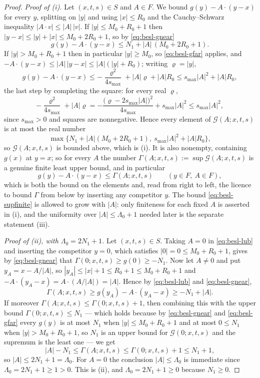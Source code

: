 \begin{proof}
\emph{Proof of (i).}
Let $(x,t,s)\in S$ and $A\in F$. We bound $g(y)-A\cdot(y-x)$ for every $y$,
splitting on $|y|$ and using $|x|\le R_0$ and the Cauchy--Schwarz inequality
$|A\cdot v|\le|A|\,|v|$.
If $|y|\le M_0+R_0+1$ then $|y-x|\le|y|+|x|\le M_0+2R_0+1$, so by
\eqref{eq:besl-gnear}
\[
  g(y)-A\cdot(y-x)\le N_1+|A|\,(M_0+2R_0+1).
\]
If $|y|>M_0+R_0+1$ then in particular $|y|\ge M_0$, so \eqref{eq:besl-gfar}
applies, and $-A\cdot(y-x)\le|A|\,|y-x|\le|A|(|y|+R_0)$; writing $\varrho=|y|$,
\[
  g(y)-A\cdot(y-x)\le-\frac{\varrho^2}{4s_{\max}}+|A|\varrho+|A|R_0
   \le s_{\max}|A|^2+|A|R_0 ,
\]
the last step by completing the square: for every real $\varrho$,
\[
  -\frac{\varrho^2}{4s_{\max}}+|A|\varrho
   =-\frac{\bigl(\varrho-2s_{\max}|A|\bigr)^2}{4s_{\max}}+s_{\max}|A|^2
   \le s_{\max}|A|^2 ,
\]
since $s_{\max}>0$ and squares are nonnegative. Hence every element of
$\mathcal G(A;x,t,s)$ is at most the real number
\begin{equation}\label{eq:besl-supfinite}
  \max\bigl\{N_1+|A|(M_0+2R_0+1),\ s_{\max}|A|^2+|A|R_0\bigr\},
\end{equation}
so $\mathcal G(A;x,t,s)$ is bounded above, which is (i). It is also nonempty,
containing $g(x)$ at $y=x$; so for every $A$ the number
$\Gamma(A;x,t,s):=\sup\mathcal G(A;x,t,s)$ is a genuine finite least upper bound,
and in particular
\begin{equation}\label{eq:besl-lub}
  g(y)-A\cdot(y-x)\le\Gamma(A;x,t,s)\qquad(y\in F,\ A\in F),
\end{equation}
which is both the bound on the elements and, read from right to left, the licence
to bound $\Gamma$ from below by inserting any competitor $y$. The bound
\eqref{eq:besl-supfinite} is allowed to grow with $|A|$: only finiteness for each
fixed $A$ is asserted in (i), and the uniformity over $|A|\le\Lambda_0+1$ needed
later is the separate statement (iii).

\emph{Proof of (ii), with $\Lambda_0=2N_1+1$.}
Let $(x,t,s)\in S$. Taking $A=0$ in \eqref{eq:besl-lub} and inserting the
competitor $y=0$, which satisfies $|0|=0\le M_0+R_0+1$, gives by
\eqref{eq:besl-gnear} that $\Gamma(0;x,t,s)\ge g(0)\ge-N_1$. Now let $A\ne0$ and
put $y_A=x-A/|A|$, so $|y_A|\le|x|+1\le R_0+1\le M_0+R_0+1$ and
$-A\cdot(y_A-x)=A\cdot(A/|A|)=|A|$. Hence by \eqref{eq:besl-lub} and
\eqref{eq:besl-gnear},
\[
  \Gamma(A;x,t,s)\ge g(y_A)-A\cdot(y_A-x)\ge-N_1+|A| .
\]
If moreover $\Gamma(A;x,t,s)\le\Gamma(0;x,t,s)+1$, then combining this with the
upper bound $\Gamma(0;x,t,s)\le N_1$ — which holds because by
\eqref{eq:besl-gnear} and \eqref{eq:besl-gfar} every $g(y)$ is at most $N_1$ when
$|y|\le M_0+R_0+1$ and at most $0\le N_1$ when $|y|>M_0+R_0+1$, so $N_1$ is an
upper bound for $\mathcal G(0;x,t,s)$ and the supremum is the least one — we get
\[
  |A|-N_1\le\Gamma(A;x,t,s)\le\Gamma(0;x,t,s)+1\le N_1+1 ,
\]
so $|A|\le2N_1+1=\Lambda_0$. For $A=0$ the conclusion $|A|\le\Lambda_0$ is
immediate since $\Lambda_0=2N_1+1\ge1>0$. This is (ii), and
$\Lambda_0=2N_1+1\ge0$ because $N_1\ge0$.


\end{proof}
